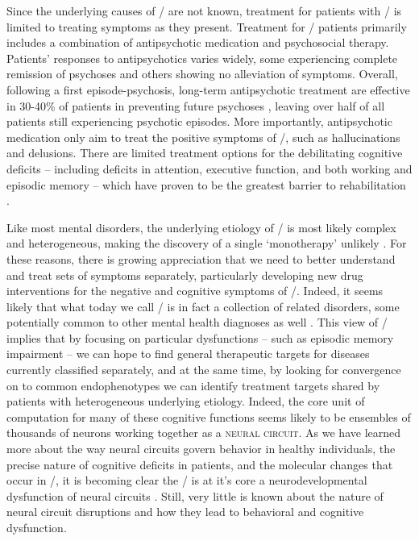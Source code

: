Since the underlying causes of \scz/ are not known, treatment for patients with \scz/ is limited to treating symptoms as they present.
Treatment for \scz/ patients primarily includes a combination of antipsychotic medication and psychosocial therapy.
Patients' responses to antipsychotics varies widely, some experiencing complete remission of psychoses and others showing no alleviation of symptoms.
Overall, following a first episode-psychosis, long-term antipsychotic treatment are effective in 30-40\% of patients in preventing future psychoses \citep{Boyer2007, Insel2010a}, leaving over half of all patients still experiencing psychotic episodes.
More importantly, antipsychotic medication only aim to treat the positive symptoms of \scz/, such as hallucinations and delusions.
There are limited treatment options for the debilitating cognitive deficits -- including deficits in attention, executive function, and both working and episodic memory -- which have proven to be the greatest barrier to rehabilitation \citep{Lieberman2005, Harrison2001, O'Carroll2000, Hyman2003}.

Like most mental disorders, the underlying etiology of \scz/ is most likely complex and heterogeneous, making the discovery of a single `monotherapy' unlikely \citep{Hyman2003}.
For these reasons, there is growing appreciation that we need to better understand and treat sets of symptoms separately, particularly developing new drug interventions for the negative and cognitive symptoms of \scz/.
Indeed, it seems likely that what today we call \scz/ is in fact a collection of related disorders, some potentially common to other mental health diagnoses as well \citep{Insel2010a}.
This view of \scz/ implies that by focusing on particular dysfunctions -- such as episodic memory impairment -- we can hope to find general therapeutic targets for diseases currently classified separately, and at the same time, by looking for convergence on to common endophenotypes we can identify treatment targets shared by patients with heterogeneous underlying etiology.
Indeed, the core unit of computation for many of these cognitive functions seems likely to be ensembles of thousands of neurons working together as a \textsc{neural circuit}.
As we have learned more about the way neural circuits govern behavior in healthy individuals, the precise nature of cognitive deficits in patients, and the molecular changes that occur in \scz/, it is becoming clear the \scz/ is at it's core a neurodevelopmental dysfunction of neural circuits \citep{Arguello2012, Insel2010a, Insel2010b, Lewis2002}.
Still, very little is known about the nature of neural circuit disruptions and how they lead to behavioral and cognitive dysfunction.

